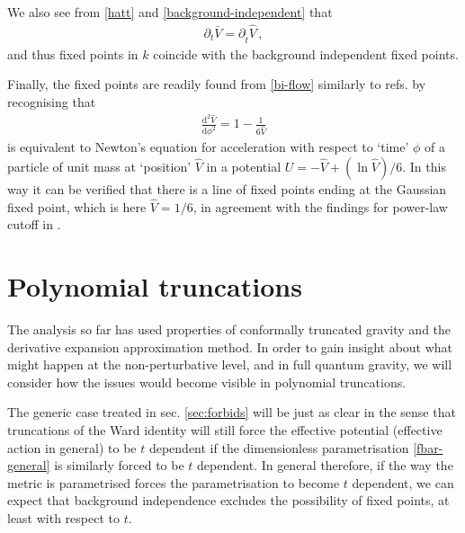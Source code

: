 \documentclass[11pt,draft]{book} %
\newcommand{\bV}{\bar V}
\newcommand{\hV}{\hat V}
\newcommand{\hatt}{\hat t}
\begin{document}
We also see from \eqref{hatt} and \eqref{background-independent} that
\begin{align}
  \partial_t \bV = \partial_{\hatt} \hV\,,
\end{align}
and thus fixed points in $k$ coincide with the background independent fixed points.

Finally, the fixed points are readily found from \eqref{bi-flow} similarly to refs.
\cite{Dietz:2016gzg,Morris:1994jc} by recognising that
\begin{align}
  \frac{\mathrm d^2\hV}{\mathrm d\phi^2} = 1-\frac{1}{6\hV}
\end{align}
is equivalent to Newton's equation for acceleration with respect to `time' $\phi$ of a particle
of unit mass at `position' $\hV$ in a potential $U=-\hV+ (\ln\hV)/6$.
In this way it can be verified that there is a line of fixed points ending at the Gaussian fixed point,
which is here $\hV=1/6$, in agreement with the findings for power-law cutoff in \cite{Dietz:2016gzg}.


\section{Polynomial truncations}
\label{sec:truncations}

The analysis  so far has used properties of conformally truncated gravity and the derivative
expansion approximation method. In order to gain insight about what might happen at the non-perturbative level,
and in full quantum gravity, we will consider how the issues would become visible in polynomial truncations.

The generic case treated in sec. \ref{sec:forbids} will be just as clear in the sense that truncations
of the Ward identity will still force the effective potential (effective action in general) to be
$t$ dependent if the dimensionless parametrisation \eqref{fbar-general} is similarly forced to be $t$ dependent.
In general therefore, if the way the metric is parametrised forces the parametrisation to become $t$ dependent,
we can expect that background independence excludes the possibility of fixed points,
at least with respect to $t$.
\end{document}
